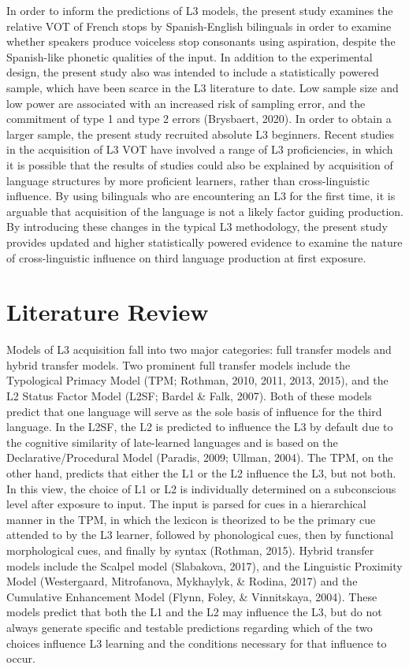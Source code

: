 \documentclass[
  english,
  man]{apa6}
\begin{document}
In order to inform the predictions of L3 models, the present study examines the relative VOT of French stops by Spanish-English bilinguals in order to examine whether speakers produce voiceless stop consonants using aspiration, despite the Spanish-like phonetic qualities of the input.
In addition to the experimental design, the present study also was intended to include a statistically powered sample, which have been scarce in the L3 literature to date.
Low sample size and low power are associated with an increased risk of sampling error, and the commitment of type 1 and type 2 errors (Brysbaert, 2020).
In order to obtain a larger sample, the present study recruited absolute L3 beginners.
Recent studies in the acquisition of L3 VOT have involved a range of L3 proficiencies, in which it is possible that the results of studies could also be explained by acquisition of language structures by more proficient learners, rather than cross-linguistic influence.
By using bilinguals who are encountering an L3 for the first time, it is arguable that acquisition of the language is not a likely factor guiding production. By introducing these changes in the typical L3 methodology, the present study provides updated and higher statistically powered evidence to examine the nature of cross-linguistic influence on third language production at first exposure.

\hypertarget{literature-review}{%
\section{Literature Review}\label{literature-review}}

Models of L3 acquisition fall into two major categories: full transfer models and hybrid transfer models.
Two prominent full transfer models include the Typological Primacy Model (TPM; Rothman, 2010, 2011, 2013, 2015), and the L2 Status Factor Model (L2SF; Bardel \& Falk, 2007).
Both of these models predict that one language will serve as the sole basis of influence for the third language.
In the L2SF, the L2 is predicted to influence the L3 by default due to the cognitive similarity of late-learned languages and is based on the Declarative/Procedural Model (Paradis, 2009; Ullman, 2004).
The TPM, on the other hand, predicts that either the L1 or the L2 influence the L3, but not both.
In this view, the choice of L1 or L2 is individually determined on a subconscious level after exposure to input.
The input is parsed for cues in a hierarchical manner in the TPM, in which the lexicon is theorized to be the primary cue attended to by the L3 learner, followed by phonological cues, then by functional morphological cues, and finally by syntax (Rothman, 2015).
Hybrid transfer models include the Scalpel model (Slabakova, 2017), and the Linguistic Proximity Model (Westergaard, Mitrofanova, Mykhaylyk, \& Rodina, 2017) and the Cumulative Enhancement Model (Flynn, Foley, \& Vinnitskaya, 2004).
These models predict that both the L1 and the L2 may influence the L3, but do not always generate specific and testable predictions regarding which of the two choices influence L3 learning and the conditions necessary for that influence to occur.
\end{document}
